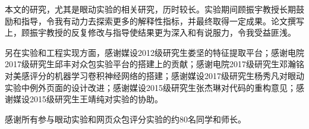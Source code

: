 \begin{thanks}

本文的研究，尤其是眼动实验的相关研究，历时较长。实验期间顾振宇教授长期鼓励和指导，令我有动力去探索更多的解释性指标，并最终取得一定成果。论文撰写上，顾振宇教授的反复修改与指导使结果更为深入和有说服力，令我受益匪浅。

另在实验和工程实现方面，感谢媒设2012级研究生娄坚的特征提取平台；感谢电院2017级研究生邱丰对众包实验平台的搭建上的贡献；感谢电院2017级研究生邓瀚铭对美感评分的机器学习卷积神经网络的搭建；感谢媒设2017级研究生杨秀凡对眼动实验中例外页面的设计改进；感谢媒设2015级研究生张杰琳对代码的重构意见；感谢媒设2015级研究生王靖纯对实验的协助。

感谢所有参与眼动实验和网页众包评分实验的约80名同学和师长。

\end{thanks}

